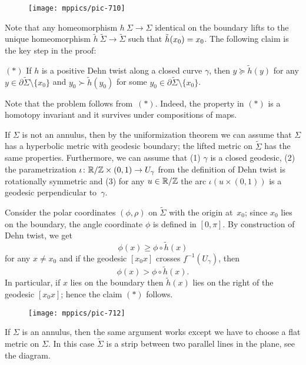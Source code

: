 {

\begin{wrapfigure}{o}{27 mm}
\vskip-0mm
\centering
\texttt{[image: mppics/pic-710]}
\end{wrapfigure}

Note that any homeomorphism $h\:\Sigma\to\Sigma$ identical on the boundary
lifts to the unique homeomorphism $\tilde h\:\tilde \Sigma\to\tilde\Sigma$ 
such that $\tilde h(x_0)\z=x_0$.
The following claim is the key step in the proof:

}

\begin{cl}{$({*})$} 
If $h$ is a positive Dehn twist along a closed curve $\gamma$,
then $y\succeq \tilde h(y)$ for any $y\in\partial\tilde\Sigma\setminus\{x_0\}$
and $y_0\succ\tilde h(y_0)$ for some $y_0\in\partial\tilde\Sigma\setminus\{x_0\}$.
\end{cl}

Note that the problem follows from~$({*})$.
Indeed, the property in $({*})$ is a homotopy invariant 
and it survives under compositions of maps.

\medskip

If $\Sigma$ is not an annulus,
then by the uniformization theorem we can assume that $\Sigma$ has a  hyperbolic metric with geodesic boundary; 
the lifted metric on $\tilde\Sigma$ has the same properties.
Furthermore, we can assume that (1) $\gamma$ is a closed geodesic,
(2) the parametrization $\iota\:\RR/\ZZ\z\times (0,1)\to U_\gamma$ from the definition of Dehn twist is rotationally symmetric 
and (3) for any $u\in \mathbb{R}/\mathbb{Z}$ the arc $\iota(u\times (0,1))$ is a geodesic perpendicular to~$\gamma$. 

Consider the polar coordinates $(\phi,\rho)$ on $\tilde\Sigma$ with the origin at~$x_0$;
since $x_0$ lies on the boundary, the angle coordinate $\phi$ is defined in $[0,\pi]$. 
By construction of Dehn twist, we get 
\[\phi(x)\ge \phi\circ\tilde h(x)\]
for any $x\ne x_0$ 
and if the geodesic $[x_0x]$ crosses $f^{-1}(U_\gamma)$, then 
\[\phi(x)> \phi\circ\tilde h(x).\]
In particular, if $x$ lies on the boundary then $\tilde h(x)$ lies on the right of the geodesic $[x_0x]$; hence the claim $({*})$ follows. 

\begin{figure}[!ht]
\vskip0mm
\centering
\texttt{[image: mppics/pic-712]}
\end{figure}

If $\Sigma$ is an annulus, then the same argument works except we have to choose a flat metric on $\Sigma$.
In this case $\tilde \Sigma$ is a strip between two parallel lines in the plane, see the diagram.
\qeds


